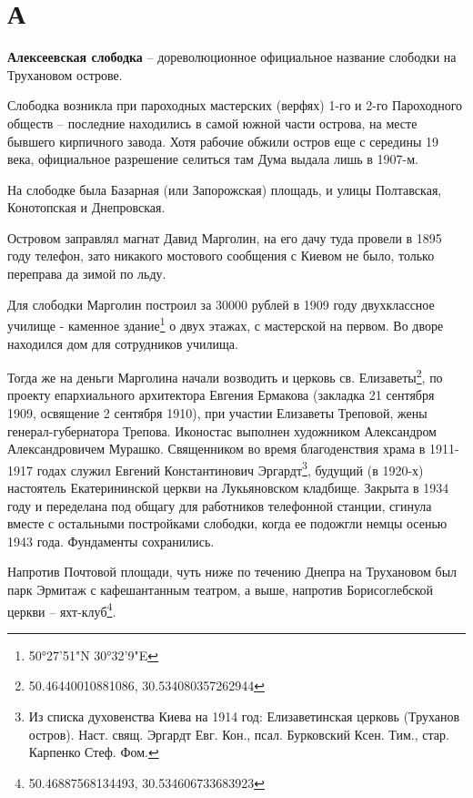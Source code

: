 \chapter*{А}

\textbf{Алексеевская слободка} –  дореволюционное официальное название слободки на Трухановом острове.

Слободка возникла при пароходных мастерских (верфях) 1-го и 2-го Пароходного обществ – последние находились в самой южной части острова, на месте бывшего кирпичного завода. Хотя рабочие обжили остров еще с середины 19 века, официальное разрешение селиться там Дума выдала лишь в 1907-м. 

На слободке была Базарная (или Запорожская) площадь, и улицы Полтавская, Конотопская и Днепровская.

Островом заправлял магнат Давид Марголин, на его дачу туда провели в 1895 году телефон, зато никакого мостового сообщения с Киевом не было, только переправа да зимой по льду.

Для слободки Марголин построил за 30000 рублей в 1909 году двухклассное училище - каменное здание\footnote{50°27'51"N 30°32'9"E} о двух этажах, с мастерской на первом. Во дворе находился дом для сотрудников училища.

Тогда же на деньги Марголина начали возводить и церковь св. Елизаветы\footnote{50.46440010881086, 30.534080357262944}, по проекту епархиального архитектора Евгения Ермакова (закладка 21 сентября 1909, освящение 2 сентября 1910), при участии Елизаветы Треповой, жены генерал-губернатора Трепова. Иконостас выполнен художником Александром Александровичем Мурашко. Священником во время благоденствия храма в 1911-1917 годах служил Евгений Константинович Эргардт\footnote{Из списка духовенства Киева на 1914 год: Елизаветинская церковь (Труханов остров). Наст. свящ. Эргардт Евг. Кон., псал. Бурковский Ксен. Тим., стар. Карпенко Стеф. Фом.}, будущий (в 1920-х) настоятель Екатерининской церкви на Лукьяновском кладбище. Закрыта в 1934 году и переделана под общагу для работников телефонной станции, сгинула вместе с остальными постройками слободки, когда ее подожгли немцы осенью 1943 года. Фундаменты сохранились.

Напротив Почтовой площади, чуть ниже по течению Днепра на Трухановом был парк Эрмитаж с кафешантанным театром, а выше, напротив Борисоглебской церкви – яхт-клуб\footnote{50.46887568134493, 30.534606733683923}.\\

\medskip

